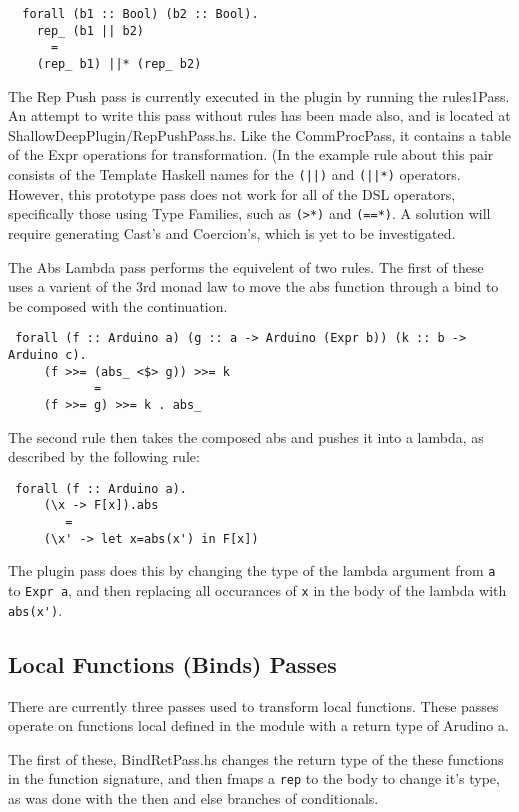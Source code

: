 \documentclass[11pt, oneside]{article}   	%
\begin{document}
\begin{verbatim}
  forall (b1 :: Bool) (b2 :: Bool).
    rep_ (b1 || b2)
      =
    (rep_ b1) ||* (rep_ b2)
\end{verbatim}

The Rep Push pass is currently executed in the plugin by running the rules1Pass. 
An attempt to write this pass without rules has been made also, and is
located at ShallowDeepPlugin/RepPushPass.hs.  Like the CommProcPass,
it contains a table of the Expr operations for transformation.  (In the example 
rule about this pair consists of the Template Haskell names for the \verb+(||)+ and \verb+(||*)+
operators.  However, this prototype pass does not work for all of the DSL 
operators, specifically those using Type Families, such as \verb+(>*)+ and \verb+(==*)+.
A solution will require generating Cast's and Coercion's, which is yet to
be investigated.

The Abs Lambda pass performs the equivelent of two rules.  The first of these
uses a varient of the 3rd monad law to move the abs function through a bind
to be composed with the continuation.

\begin{verbatim}
 forall (f :: Arduino a) (g :: a -> Arduino (Expr b)) (k :: b -> Arduino c).
     (f >>= (abs_ <$> g)) >>= k
            =
     (f >>= g) >>= k . abs_
\end{verbatim}

The second rule then takes the composed abs and pushes it into a lambda, as
described by the following rule:

\begin{verbatim}
 forall (f :: Arduino a).
     (\x -> F[x]).abs
        =
     (\x' -> let x=abs(x') in F[x])
\end{verbatim}

The plugin pass does this by changing the type of the lambda argument from
\verb+a+ to \verb+Expr a+, and then replacing all occurances of \verb+x+
in the body of the lambda with \verb+abs(x')+.

\subsection{Local Functions (Binds) Passes}

There are currently three passes used to transform local functions.  These
passes operate on functions local defined in the module with a return type
of Arudino a.

The first of these, BindRetPass.hs changes the return type of the these
functions in the function signature, and then fmaps a \verb+rep+ to the body to 
change it's type, as was done with the then and else branches of 
conditionals.
\end{document}
